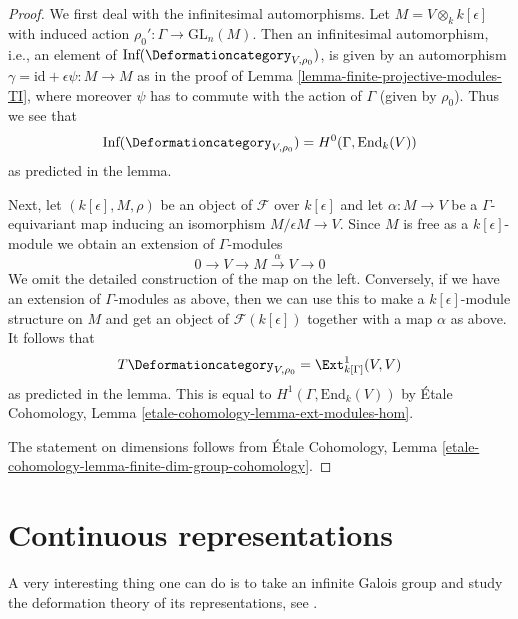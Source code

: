 \begin{proof}
We first deal with the infinitesimal automorphisms.
Let $M = V \otimes_k k[\epsilon]$ with induced action
$\rho_0' : \Gamma \to \text{GL}_n(M)$.
Then an infinitesimal automorphism, i.e., an element of
$\text{Inf}(\Deformationcategory_{V, \rho_0})$,
is given by an automorphism
$\gamma = \text{id} + \epsilon \psi : M \to M$
as in the proof of Lemma \ref{lemma-finite-projective-modules-TI},
where moreover $\psi$ has to commute
with the action of $\Gamma$ (given by $\rho_0$).
Thus we see that
$$
\text{Inf}(\Deformationcategory_{V, \rho_0}) = H^0(\Gamma, \text{End}_k(V))
$$
as predicted in the lemma.

\medskip\noindent
Next, let $(k[\epsilon], M, \rho)$ be an object of $\mathcal{F}$
over $k[\epsilon]$ and let $\alpha : M \to V$ be a $\Gamma$-equivariant map
inducing an isomorphism $M/\epsilon M \to V$.
Since $M$ is free as a $k[\epsilon]$-module we obtain
an extension of $\Gamma$-modules
$$
0 \to V \to M \xrightarrow{\alpha} V \to 0
$$
We omit the detailed construction of the map on the left.
Conversely, if we have an extension of $\Gamma$-modules as
above, then we can use this to make a $k[\epsilon]$-module
structure on $M$ and get an object of $\mathcal{F}(k[\epsilon])$
together with a map $\alpha$ as above.
It follows that
$$
T\Deformationcategory_{V, \rho_0} = \Ext^1_{k[\Gamma]}(V, V)
$$
as predicted in the lemma. This is equal to
$H^1(\Gamma, \text{End}_k(V))$ by
\'Etale Cohomology, Lemma \ref{etale-cohomology-lemma-ext-modules-hom}.

\medskip\noindent
The statement on dimensions follows from
\'Etale Cohomology, Lemma
\ref{etale-cohomology-lemma-finite-dim-group-cohomology}.
\end{proof}




\section{Continuous representations}
\label{section-continuous-representations}

\noindent
A very interesting thing one can do is to take an infinite Galois
group and study the deformation theory of its representations, see
\cite{Mazur-deforming}.

